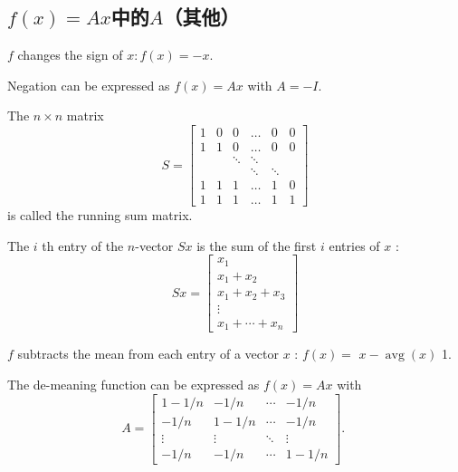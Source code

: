 \subsection{$f(x)=A x$中的$A$（其他）}

\begin{example}[Negation]
    $ f $ changes the sign of $ x: f(x)=-x $.

Negation can be expressed as $ f(x)=A x $ with $ A=-I $.
\end{example}

\begin{example}
    The $ n \times n $ matrix
\begin{equation}
S=\left[\begin{array}{cccccc}
1 & 0 & 0 & \ldots & 0 & 0 \\
1 & 1 & 0 & \ldots & 0 & 0 \\
& & \ddots & \ddots & & \\
& & & \ddots & \ddots & \\
1 & 1 & 1 & \ldots & 1 & 0 \\
1 & 1 & 1 & \ldots & 1 & 1
\end{array}\right]
\end{equation}
is called the running sum matrix. 

The $ i $ th entry of the $ n $-vector $ S x $ is the sum of the first $ i $ entries of $ x $ :
\begin{equation}
S x=\left[\begin{array}{c}
x_{1} \\
x_{1}+x_{2} \\
x_{1}+x_{2}+x_{3} \\
\vdots \\
x_{1}+\cdots+x_{n}
\end{array}\right]
\end{equation}
\end{example}

\begin{example}
    $ f $ subtracts the mean from each entry of a vector $ x $ : $ f(x)= $ $ x-\operatorname{avg}(x) $ 1.

The de-meaning function can be expressed as $ f(x)=A x $ with
\begin{equation}
A=\left[\begin{array}{cccc}
1-1 / n & -1 / n & \cdots & -1 / n \\
-1 / n & 1-1 / n & \cdots & -1 / n \\
\vdots & \vdots & \ddots & \vdots \\
-1 / n & -1 / n & \cdots & 1-1 / n
\end{array}\right] \text {. }
\end{equation}
\end{example}

